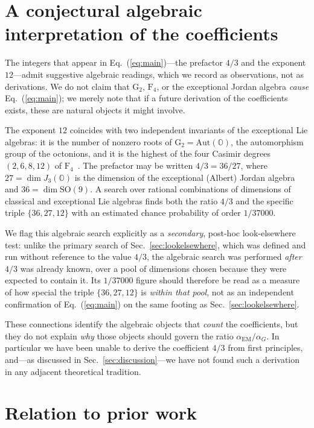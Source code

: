 \documentclass[aps,prd,twocolumn,amsmath,amssymb,floatfix,nofootinbib]{revtex4-2}
\begin{document}
\section{A conjectural algebraic interpretation of the coefficients}
\label{sec:algebra}

The integers that appear in Eq.~(\ref{eq:main})---the prefactor $4/3$ and the
exponent $12$---admit suggestive algebraic readings, which we record as
observations, not as derivations. We do not claim that $\mathrm{G}_2$,
$\mathrm{F}_4$, or the exceptional Jordan algebra \emph{cause}
Eq.~(\ref{eq:main}); we merely note that if a future derivation of the
coefficients exists, these are natural objects it might involve.

The exponent $12$ coincides with two independent invariants of the exceptional
Lie algebras: it is the number of nonzero roots of
$\mathrm{G}_2 = \mathrm{Aut}(\mathbb{O})$, the automorphism group of the
octonions, and it is the highest of the four Casimir degrees $(2,6,8,12)$ of
$\mathrm{F}_4$~\cite{bincer1993}. The prefactor may be written
$4/3 = 36/27$, where $27 = \dim J_3(\mathbb{O})$ is the dimension of the
exceptional (Albert) Jordan algebra and $36 = \dim \mathrm{SO}(9)$. A search
over rational combinations of dimensions of classical and exceptional Lie
algebras finds both the ratio $4/3$ and the specific triple
$\{36,27,12\}$ with an estimated chance probability of order $1/37000$.

We flag this algebraic search explicitly as a \emph{secondary}, post-hoc
look-elsewhere test: unlike the primary search of
Sec.~\ref{sec:lookelsewhere}, which was defined and run without reference to
the value $4/3$, the algebraic search was performed \emph{after} $4/3$ was
already known, over a pool of dimensions chosen because they were expected to
contain it. Its $1/37000$ figure should therefore be read as a measure of how
special the triple $\{36,27,12\}$ is \emph{within that pool}, not as an
independent confirmation of Eq.~(\ref{eq:main}) on the same footing as
Sec.~\ref{sec:lookelsewhere}.

These connections identify the algebraic objects that \emph{count} the
coefficients, but they do not explain \emph{why} those objects should govern
the ratio $\alpha_{\mathrm{EM}}/\alpha_G$. In particular we have been unable to
derive the coefficient $4/3$ from first principles, and---as discussed in
Sec.~\ref{sec:discussion}---we have not found such a derivation in any adjacent
theoretical tradition.

\section{Relation to prior work}
\end{document}

